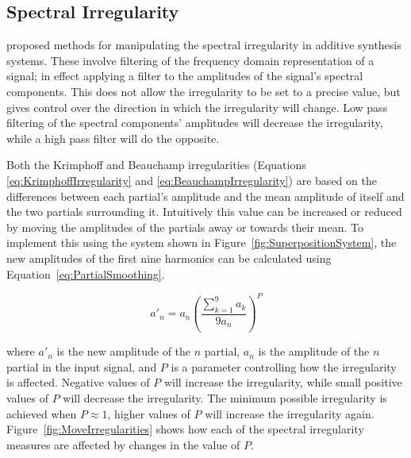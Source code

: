 	\subsection{Spectral Irregularity}
	\label{sec:FeatureControl-Parameterisation-Irregularity}
		\citet{beauchamp2007analysis} proposed methods for manipulating the spectral irregularity in additive
		synthesis systems. These involve filtering of the frequency domain representation of a signal; in effect
		applying a filter to the amplitudes of the signal's spectral components. This does not allow the
		irregularity to be set to a precise value, but gives control over the direction in which the irregularity
		will change. Low pass filtering of the spectral components' amplitudes will decrease the irregularity,
		while a high pass filter will do the opposite.
		
		Both the Krimphoff and Beauchamp irregularities (Equations \ref{eq:KrimphoffIrregularity} and
		\ref{eq:BeauchampIrregularity}) are based on the differences between each partial's amplitude and the mean
		amplitude of itself and the two partials surrounding it. Intuitively this value can be increased or reduced
		by moving the amplitudes of the partials away or towards their mean. To implement this using the system
		shown in Figure~\ref{fig:SuperpositionSystem}, the new amplitudes of the first nine harmonics can be
		calculated using Equation~\ref{eq:PartialSmoothing}.

		\begin{equation}
			a'_{n} = a_{n} \left( \frac{\sum_{k = 1}^{9} a_{k}}{9a_{n}} \right) ^{P}
			\label{eq:PartialSmoothing}
		\end{equation}

		where $a'_{n}$ is the new amplitude of the $n$ partial, $a_{n}$ is the amplitude of the
		$n$ partial in the input signal, and $P$ is a parameter controlling how the irregularity is
		affected. Negative values of $P$ will increase the irregularity, while small positive values of $P$ will
		decrease the irregularity. The minimum possible irregularity is achieved when $P \approx 1$, higher values
		of $P$ will increase the irregularity again. Figure~\ref{fig:MoveIrregularities} shows how each of the
		spectral irregularity measures are affected by changes in the value of $P$.

